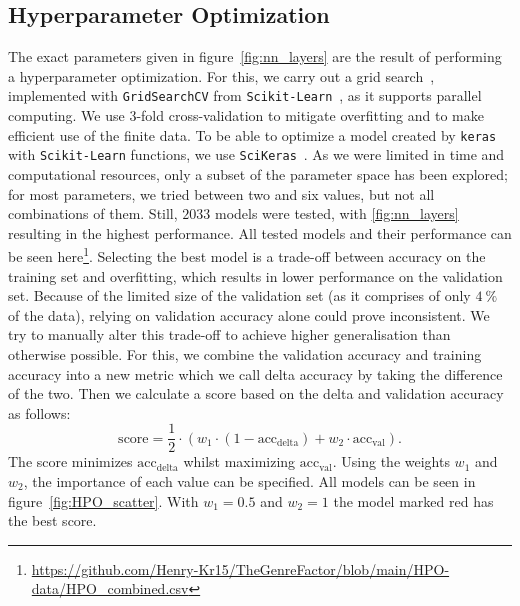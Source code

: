 \documentclass[
  12pt,
  bibliography=totoc,     %
  captions=tableheading,  %
  titlepage=firstiscover, %
]{scrartcl}
\begin{document}
\subsection{Hyperparameter Optimization}
The exact parameters given in figure~\ref{fig:nn_layers} are the result of performing a hyperparameter optimization. For this, we carry out a
grid search~\cite{gridsearch}, implemented with \texttt{GridSearchCV} from \texttt{Scikit-Learn}~\cite{scikit-learn}, as it supports parallel computing.
We use $3$-fold cross-validation  to mitigate overfitting and to make efficient use of the finite data.
To be able to optimize a model created by \texttt{keras} with \texttt{Scikit-Learn} functions, we use \texttt{SciKeras}~\cite{scikeras}. As we were limited in time and
computational resources, only a subset of the parameter space has been explored; for most parameters, we tried between two and six values, but
not all combinations of them. Still, $2033$ models were tested, with \ref{fig:nn_layers} resulting in the highest performance. All tested models and their performance can be
seen here\footnote{\url{https://github.com/Henry-Kr15/TheGenreFactor/blob/main/HPO-data/HPO_combined.csv}}.
Selecting the best model is a trade-off between accuracy on the training set and overfitting, which results in lower performance on the validation set. Because of the limited
size of the validation set (as it comprises of only $\SI{4}{\percent}$ of the data), relying on validation accuracy alone could prove inconsistent. We try to manually alter
this trade-off to achieve higher generalisation than otherwise possible. For this, we combine the validation accuracy and training accuracy into a new metric which we call
delta accuracy by taking the difference of the two. Then we calculate a score based on the delta and validation accuracy as follows:
\begin{equation}
	\text{score} = \frac{1}{2} \cdot (w_{1} \cdot (1 - \text{acc}_{\text{delta}}) + w_{2} \cdot \text{acc}_{\text{val}}).
  \label{eqn:score}
\end{equation}
The score minimizes $\text{acc}_{\text{delta}}$ whilst maximizing $\text{acc}_{\text{val}}$. Using the weights $w_{1}$ and $w_{2}$, the importance of each value can be specified.
All models can be seen in figure~\ref{fig:HPO_scatter}. With $w_{1}=0.5$ and $w_{2}=1$ the model marked red has the best score.
\end{document}
